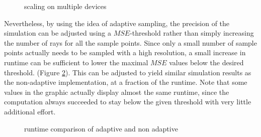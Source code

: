 \begin{figure}[H]
  \centerline{
    }
  \caption{scaling on multiple devices}
  \label{plot:gpu_scaling}
\end{figure}
Nevertheless, by using the idea of adaptive sampling, the precision of the
simulation can be adjusted using a $MSE$-threshold rather than simply increasing
the number of rays for all the sample points. Since only a small number of
sample points actually needs to be sampled with a high resolution, a small
increase in runtime can be sufficient to lower the maximal $MSE$ values below
the desired threshold. (Figure
\ref{plot:adaptive_runtime}). This can be adjusted to yield similar simulation
results as the non-adaptive implementation, at a fraction of the runtime. Note
that some values in the graphic actually display almost the same runtime, since
the computation always succeeded to stay below the given threshold with very
little additional effort.
\begin{figure}[H]
  \centerline{
    }
  \caption{runtime comparison of adaptive and non adaptive }
  \label{plot:adaptive_runtime}
\end{figure}
